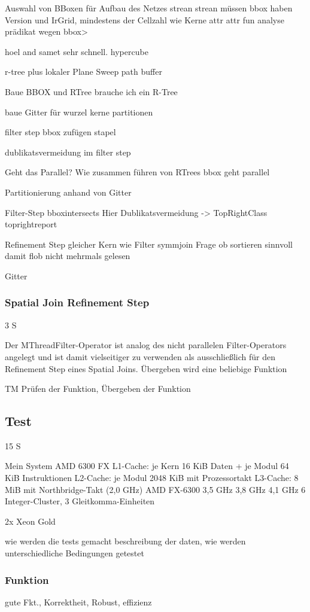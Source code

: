 \documentclass[a4paper,12pt,twoside]{article}
\begin{document}
Auswahl von BBoxen für Aufbau des Netzes
strean strean müssen bbox haben Version und IrGrid, mindestens der Cellzahl wie Kerne
attr attr fun
analyse prädikat wegen bbox>

hoel and samet sehr schnell. hypercube

r-tree plus lokaler Plane Sweep
path buffer


Baue BBOX und RTree
brauche ich ein R-Tree

baue Gitter für wurzel kerne partitionen

filter step bbox zufügen stapel

dublikatsvermeidung im filter step

Geht das Parallel? Wie zusammen führen von RTrees
bbox geht parallel

Partitionierung
anhand von Gitter

Filter-Step
bboxintersects
Hier Dublikatsvermeidung -> TopRightClass
toprightreport

Refinement Step gleicher Kern wie Filter
symmjoin
Frage ob sortieren sinnvoll damit flob nicht mehrmals gelesen

Gitter

\subsubsection{Spatial Join Refinement Step} 3 S

Der MThreadFilter-Operator ist analog des nicht parallelen Filter-Operators angelegt und ist damit vielseitiger zu verwenden als ausschließlich für den Refinement Step eines Spatial Joins. Übergeben wird eine beliebige Funktion

TM Prüfen der Funktion, Übergeben der Funktion

\subsection{Test} 15 S

Mein System AMD 6300 FX
L1-Cache: je Kern 16 KiB Daten + je Modul 64 KiB Instruktionen
L2-Cache: je Modul 2048 KiB mit Prozessortakt
L3-Cache: 8 MiB mit Northbridge-Takt (2,0 GHz)
AMD FX-6300 	3,5 GHz 	3,8 GHz 	4,1 GHz
6 Integer-Cluster, 3 Gleitkomma-Einheiten

2x Xeon Gold 

wie werden die tests gemacht
beschreibung der daten, wie werden unterschiedliche Bedingungen getestet

\subsubsection{Funktion}
gute Fkt., Korrektheit, Robust, effizienz
\end{document}
